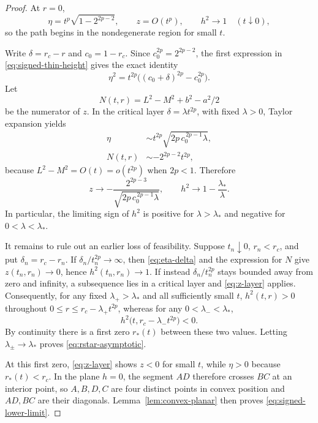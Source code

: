 \documentclass[11pt,a4paper]{article}
\theoremstyle{definition}
\theoremstyle{remark}
\begin{document}
\begin{proof}
At $r=0$,
\[
 \eta=t^p\sqrt{1-2^{2p-2}},\qquad z=O(t^p),\qquad h^2\longrightarrow1
 \quad(t\downarrow0),
\]
so the path begins in the nondegenerate region for small $t$.

Write $\delta=r_c-r$ and $c_0=1-r_c$.  Since
$c_0^{2p}=2^{2p-2}$, the first expression in
\eqref{eq:signed-thin-height} gives the exact identity
\begin{equation}\label{eq:eta-delta}
 \eta^2=t^{2p}\bigl((c_0+\delta)^{2p}-c_0^{2p}\bigr).
\end{equation}
Let
\[
 N(t,r)=L^2-M^2+b^2-a^2/2
\]
be the numerator of $z$.  In the critical layer
$\delta=\lambda t^{2p}$, with fixed $\lambda>0$, Taylor expansion yields
\begin{align}
 \eta
 &\sim t^{2p}\sqrt{2p\,c_0^{\,2p-1}\lambda},\label{eq:eta-layer}\\
 N(t,r)
 &\sim-2^{2p-2}t^{2p},\label{eq:n-layer}
\end{align}
because $L^2-M^2=O(t)=o(t^{2p})$ when $2p<1$.  Therefore
\begin{equation}\label{eq:z-layer}
 z\longrightarrow
 -\frac{2^{2p-3}}
 {\sqrt{2p\,c_0^{\,2p-1}\lambda}},
 \qquad
 h^2\longrightarrow1-\frac{\lambda_*}{\lambda}.
\end{equation}
In particular, the limiting sign of $h^2$ is positive for
$\lambda>\lambda_*$ and negative for $0<\lambda<\lambda_*$.

It remains to rule out an earlier loss of feasibility.  Suppose
$t_n\downarrow0$, $r_n<r_c$, and put
$\delta_n=r_c-r_n$.  If
$\delta_n/t_n^{2p}\to\infty$, then
\eqref{eq:eta-delta} and the expression for $N$ give
$z(t_n,r_n)\to0$, hence $h^2(t_n,r_n)\to1$.  If instead
$\delta_n/t_n^{2p}$ stays bounded away from zero and infinity, a subsequence
lies in a critical layer and \eqref{eq:z-layer} applies.  Consequently, for
any fixed $\lambda_+>\lambda_*$ and all sufficiently small $t$,
$h^2(t,r)>0$ throughout
$0\le r\le r_c-\lambda_+t^{2p}$, whereas for any
$0<\lambda_-<\lambda_*$,
\[
 h^2\bigl(t,r_c-\lambda_-t^{2p}\bigr)<0.
\]
By continuity there is a first zero $r_*(t)$ between these two values.
Letting $\lambda_\pm\to\lambda_*$ proves
\eqref{eq:rstar-asymptotic}.

At this first zero, \eqref{eq:z-layer} shows $z<0$ for small $t$, while
$\eta>0$ because $r_*(t)<r_c$.  In the plane $h=0$, the segment $AD$ therefore
crosses $BC$ at an interior point, so $A,B,D,C$ are four distinct points in
convex position and $AD,BC$ are their diagonals.  Lemma~\ref{lem:convex-planar}
then proves \eqref{eq:signed-lower-limit}.
\end{proof}
\end{document}
